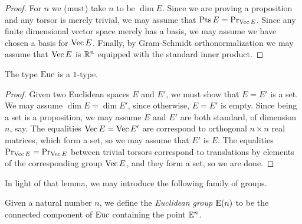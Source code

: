 \begin{proof}
  For $n$ we (must) take $n$ to be $\dim E$.  Since we are proving a
  proposition and any torsor is merely trivial, we may assume that $\operatorname{Pts} E =
  \mathrm{Pr}_{{\operatorname{Vec} E}}$.  Since any finite dimensional vector space merely has a
  basis, we may assume we have chosen a basis for $\operatorname{Vec} E$.  Finally, by
  Gram-Schmidt orthonormalization we may assume that $\operatorname{Vec} E$ is $\mathbb{R}^n$
  equipped with the standard inner product.
\end{proof}

\begin{lemma}\label{lem:EuclideanSpace1Type}
  The type $\mathrm{Euc}$ is a $1$-type.
\end{lemma}

\begin{proof}
  Given two Euclidean spaces $E$ and $E'$, we must show that $E=E'$ is a set.
  We may assume $\dim E = \dim E'$, since otherwise, $E=E'$ is empty.  Since
  being a set is a proposition, we may assume $E$ and $E'$ are both standard,
  of dimension $n$, say.  The equalities $\operatorname{Vec} E = \operatorname{Vec} E'$ are
  correspond to orthogonal $n \times n$ real matrices, which form a set, so we
  may assume that $E'$ is $E$.  The equalities $\mathrm{Pr}_{{\operatorname{Vec} E}} =
  \mathrm{Pr}_{{\operatorname{Vec} E}}$ between trivial torsors correspond to translations by
  elements of the corresponding group $\operatorname{Vec} E$, and they form a set, so we
  are done.
\end{proof}

In light of that lemma, we may introduce the following family of groups.

\begin{definition}\label{def:EuclideanGroup}
  Given a natural number $n$, we define the {\em Euclidean group} $\mathrm E(n)$ to be
  the connected component of $\mathrm{Euc}$ containing the point $\mathbb E^n$.
\end{definition}
